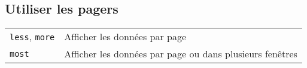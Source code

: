\documentclass[10pt,a4paper]{article}
\begin{document}
\begin{multicols}{2}
\section{Utiliser les pagers}
\begin{tabular}{ p{2.5cm} p{8.5cm} }
  \hline
  \texttt{less}, \texttt{more} & Afficher les données par page \\
  \rowcolor{Gray}
  \texttt{most} & Afficher les données par page ou dans plusieurs fenêtres \\
  \hline
\end{tabular}




\end{multicols}

\newpage

\cheatsheet
\end{document}
